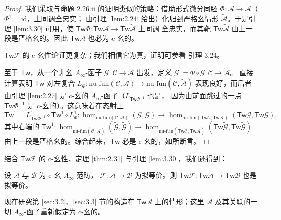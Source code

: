 \begin{proof}
我们采取与命题 2.26.ii 的证明类似的策略：借助形式微分同胚
$\Phi:\mathcal A\to\tilde{\mathcal A}$（$\Phi^1=\mathrm{id}$，上同调全忠实；
由引理 \ref{lem:2.24} 给出）化归到严格幺情形 $\tilde{\mathcal A}$。于是引理
\ref{lem:3.30} 可用，使
$\mathsf{Tw}\Phi:\mathsf{Tw}\mathcal A\to\mathsf{Tw}\tilde{\mathcal A}$ 上同调
全忠实，而其靶 $\mathsf{Tw}\tilde{\mathcal A}$ 由上一段是严格幺的。因此
$\mathsf{Tw}\mathcal A$ 也必为 c-幺的。

$\mathsf{Tw}\mathcal F$ 的 c-幺性论证更复杂；我们相信它为真，证明可参看
\cite{Sei08} 引理 3.24。

至于 $\mathsf{Tw}$，从一个非幺 $A_\infty$-函子
$\mathcal G:\mathcal C\to\mathcal A$ 出发，定义
$\tilde{\mathcal G}:=\Phi\circ\mathcal G:\mathcal C\to\tilde{\mathcal A}$。
直接计算表明 $\mathsf{Tw}$ 对左复合
$L_\Phi:\mathrm{nu\text{-}fun}(\mathcal C,\mathcal A)\to
\mathrm{nu\text{-}fun}(\mathcal C,\tilde{\mathcal A})$ 表现良好，而后者由引理
\ref{lem:2.27} 是 c-幺的 $A_\infty$-函子（$L_{\mathsf{Tw}\Phi^{-1}}$ 也是，
因为由前面跳过的一点 $\mathsf{Tw}\Phi^{-1}$ 是 c-幺的）。这意味着在态射上
\[
  \mathsf{Tw}^1=L^1_{\mathsf{Tw}\Phi^{-1}}\circ\mathsf{Tw}^1\circ
  L^1_\Phi:\hom_{\mathrm{nu\text{-}fun}(\mathcal C,\mathcal A)}
  (\mathcal G,\mathcal G)\to\hom_{\mathrm{nu\text{-}fun}
  (\mathsf{Tw}\mathcal C,\mathsf{Tw}\mathcal A)}
  (\mathsf{Tw}\mathcal G,\mathsf{Tw}\mathcal G),
\]
其中右端的 $\mathsf{Tw}^1:\hom_{\mathrm{nu\text{-}fun}(\mathcal C,
\tilde{\mathcal A})}(\tilde{\mathcal G},\tilde{\mathcal G})\to
\hom_{\mathrm{nu\text{-}fun}(\mathsf{Tw}\mathcal C,\mathsf{Tw}
\tilde{\mathcal A})}(\mathsf{Tw}\tilde{\mathcal G},
\mathsf{Tw}\tilde{\mathcal G})$ 由上一段是严格幺的。综合起来，$\mathsf{Tw}$
必是 c-幺的，如所断言。
\end{proof}

结合 $\mathsf{Tw}\mathcal F$ 的 c-幺性、定理 \ref{thm:2.31} 与引理
\ref{lem:3.30}，我们还得到：

\begin{Cor}\label{cor:3.32}
设 $\mathcal A$ 与 $\mathcal B$ 为 c-幺 $A_\infty$-范畴，
$\mathcal F:\mathcal A\to\mathcal B$ 为拟等价。则
$\mathsf{Tw}\mathcal F:\mathsf{Tw}\mathcal A\to\mathsf{Tw}\mathcal B$ 也是
拟等价。
\end{Cor}

现在研究第 \ref{sec:3.2}、\ref{sec:3.3} 节的构造在
$\mathsf{Tw}\mathcal A$ 上的情形；这里 $\mathcal A$ 及其关联的一切
$A_\infty$-函子重新假定为 c-幺的。

